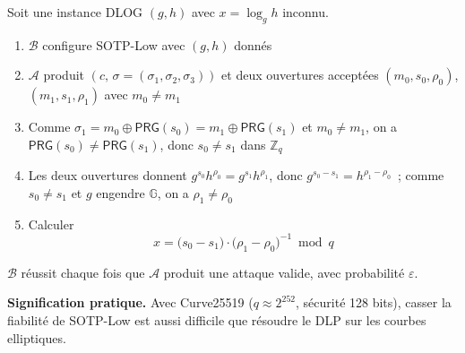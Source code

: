 \begin{sloppypar}
\begin{Preuve}
Soit une instance DLOG $(g,h)$ avec $x = \log_g h$ inconnu.
\begin{enumerate}
\item $\mathcal{B}$ configure SOTP-Low avec $(g,h)$ donn\'es
\item $\mathcal{A}$ produit $(c,\,\sigma{=}(\sigma_1,\sigma_2,\sigma_3))$ et deux
      ouvertures accept\'ees $(m_0, s_0, \rho_0)$, $(m_1, s_1, \rho_1)$ avec
      $m_0 \neq m_1$
\item Comme $\sigma_1 = m_0 \oplus \mathsf{PRG}(s_0) = m_1 \oplus \mathsf{PRG}(s_1)$ et
      $m_0 \neq m_1$, on a $\mathsf{PRG}(s_0) \neq \mathsf{PRG}(s_1)$, donc
      $s_0 \neq s_1$ dans $\mathbb{Z}_q$
\item Les deux ouvertures donnent $g^{s_0}h^{\rho_0} = g^{s_1}h^{\rho_1}$, donc
      $g^{s_0-s_1} = h^{\rho_1-\rho_0}$~; comme $s_0 \neq s_1$ et $g$ engendre
      $\mathbb{G}$, on a $\rho_1 \neq \rho_0$
\item Calculer
\begin{equation}
x = \bigl(s_0-s_1\bigr)\cdot\bigl(\rho_1-\rho_0\bigr)^{-1} \bmod q
\end{equation}
\end{enumerate}
$\mathcal{B}$ r\'eussit chaque fois que $\mathcal{A}$ produit une
attaque valide, avec probabilit\'e $\varepsilon$.
\end{Preuve}

\noindent\textbf{Signification pratique.} Avec Curve25519 ($q \approx 2^{252}$,
s\'ecurit\'e 128 bits), casser la fiabilit\'e de SOTP-Low est aussi difficile
que r\'esoudre le DLP sur les courbes elliptiques.
\end{sloppypar}

